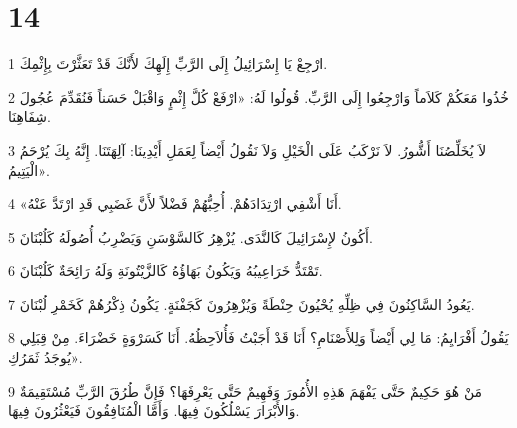 \chapter{14}

\par 1 ارْجِعْ يَا إِسْرَائِيلُ إِلَى الرَّبِّ إِلَهِكَ لأَنَّكَ قَدْ تَعَثَّرْتَ بِإِثْمِكَ.
\par 2 خُذُوا مَعَكُمْ كَلاَماً وَارْجِعُوا إِلَى الرَّبِّ. قُولُوا لَهُ: «ارْفَعْ كُلَّ إِثْمٍ وَاقْبَلْ حَسَناً فَنُقَدِّمَ عُجُولَ شِفَاهِنَا.
\par 3 لاَ يُخَلِّصُنَا أَشُّورُ. لاَ نَرْكَبُ عَلَى الْخَيْلِ وَلاَ نَقُولُ أَيْضاً لِعَمَلِ أَيْدِينَا: آلِهَتَنَا. إِنَّهُ بِكَ يُرْحَمُ الْيَتِيمُ».
\par 4 «أَنَا أَشْفِي ارْتِدَادَهُمْ. أُحِبُّهُمْ فَضْلاً لأَنَّ غَضَبِي قَدِ ارْتَدَّ عَنْهُ.
\par 5 أَكُونُ لإِسْرَائِيلَ كَالنَّدَى. يُزْهِرُ كَالسَّوْسَنِ وَيَضْرِبُ أُصُولَهُ كَلُبْنَانَ.
\par 6 تَمْتَدُّ خَرَاعِيبُهُ وَيَكُونُ بَهَاؤُهُ كَالزَّيْتُونَةِ وَلَهُ رَائِحَةٌ كَلُبْنَانَ.
\par 7 يَعُودُ السَّاكِنُونَ فِي ظِلِّهِ يُحْيُونَ حِنْطَةً وَيُزْهِرُونَ كَجَفْنَةٍ. يَكُونُ ذِكْرُهُمْ كَخَمْرِ لُبْنَانَ.
\par 8 يَقُولُ أَفْرَايِمُ: مَا لِي أَيْضاً وَلِلأَصْنَامِ؟ أَنَا قَدْ أَجَبْتُ فَأُلاَحِظُهُ. أَنَا كَسَرْوَةٍ خَضْرَاءَ. مِنْ قِبَلِي يُوجَدُ ثَمَرُكِ».
\par 9 مَنْ هُوَ حَكِيمٌ حَتَّى يَفْهَمَ هَذِهِ الأُمُورَ وَفَهِيمٌ حَتَّى يَعْرِفَهَا؟ فَإِنَّ طُرُقَ الرَّبِّ مُسْتَقِيمَةٌ وَالأَبْرَارَ يَسْلُكُونَ فِيهَا. وَأَمَّا الْمُنَافِقُونَ فَيَعْثُرُونَ فِيهَا.


